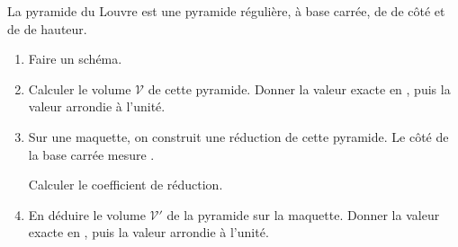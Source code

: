 \begin{exercice*}
    La pyramide du Louvre est une pyramide régulière, à base carrée, de  de côté et de  de hauteur.

    \begin{enumerate}
        \item Faire un schéma.
        \item Calculer le volume $\mathcal{V}$ de cette pyramide. Donner la valeur exacte en \Lg[m]{}, puis la valeur arrondie à l'unité.
        \item Sur une maquette, on construit une réduction de cette pyramide. Le côté de la base carrée mesure .
        
        Calculer le coefficient de réduction.
        \item En déduire le volume $\mathcal{V'}$ de la pyramide sur la maquette. Donner la valeur exacte en \Vol[cm]{}, puis la valeur arrondie à l'unité.
    \end{enumerate}
\end{exercice*}
